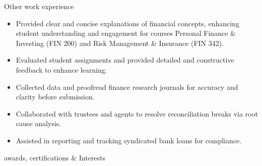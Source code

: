 \documentclass{resume}
\begin{document}
\begin{experienceSection}{Other work experience}
    \experienceItem[
        position={Teaching Assistant},
        location={Fort Collins, CO},
        company={Colorado State University, (20 hours/week)},
        duration={Aug 2021 – May 2022}
    ]
    \begin{itemize}
        \vspace{-0.2em}
        \itemsep -6pt {}
        \item Provided clear and concise explanations of financial concepts, enhancing student understanding and engagement for courses Personal Finance \& Investing (FIN 200) and Risk Management \& Insurance (FIN 342).
        \item Evaluated student assignments and provided detailed and constructive feedback to enhance learning.
        \item Collected data and proofread finance research journals for accuracy and clarity before submission.
    \end{itemize}

    \experienceItem[
        position={Bank loans Analyst (Intern)},
        location={Denver, CO},
        company={Invesco, (20 hours/week)},
        duration={Jan 2022 – Apr 2022}
    ]
    \begin{itemize}
        \vspace{-0.2em}
        \itemsep -6pt {}
        \item Collaborated with trustees and agents to resolve reconciliation breaks via root cause analysis.
        \item Assisted in reporting and tracking syndicated bank loans for compliance.
    \end{itemize}
\end{experienceSection}

\begin{skillsSection}{awards, certifications \& Interests}
    \skillItem[
        category={AWARDS},
        skills={Blue Ribbon – FactSet (2020), Lions Lair Finalist – Invesco, Appreciation – Invesco (2016, 2017)}
    ] \\
    \skillItem[
        category={Certifications \& Training},
        skills={Financial Planning \& Analysis (FP\&A) by CFI, FRM Part 1 Candidate}
    ]
\end{skillsSection}
\end{document}
